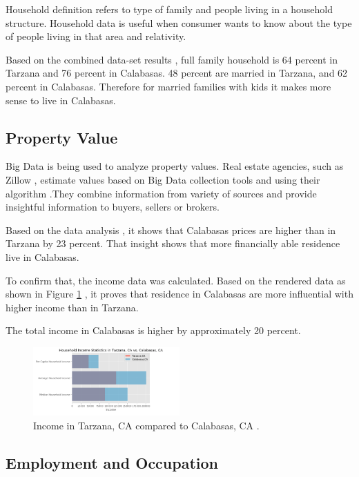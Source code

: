 \documentclass[sigconf]{acmart}
\begin{document}
Household definition refers to type of family and people living in a household structure.
Household data is useful when consumer wants to know about the type of people living in that area and relativity.

Based on the combined data-set results \cite{md}, full family household is 64 percent in Tarzana and 76 percent in Calabasas. 48 percent are married in Tarzana, and 62 percent in Calabasas. Therefore for married families with kids it makes more sense to live in Calabasas.

\subsection{Property Value}

Big Data is being used to analyze property values. Real estate agencies, such as Zillow \cite{zillow}, estimate values based on Big Data collection tools and using their algorithm  \cite{zestimate}.They combine information from variety of sources and provide insightful information to buyers, sellers or brokers. 

Based on the data analysis \cite{md}, it shows that Calabasas prices are higher than in Tarzana by 23 percent. That insight shows that more financially able residence live in Calabasas.

To confirm that, the income data was calculated. Based on the rendered data as shown in Figure \ref{fig:figure7} \cite{md}, it proves that residence in Calabasas are more influential with higher income than in Tarzana.

The total income in Calabasas is higher by approximately 20 percent.

\begin{figure}
  \centering
  \includegraphics[width=0.5\textwidth]{images/figure7.png}
  \caption{Income in Tarzana, CA compared to Calabasas, CA  \cite{md}.} \label{fig:figure7} 
\end{figure}

\subsection{Employment and Occupation}
\end{document}
